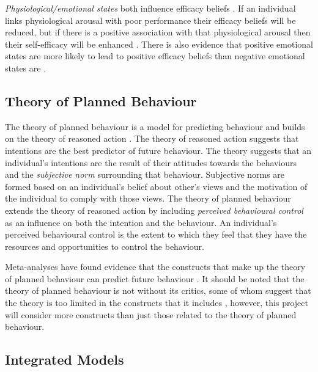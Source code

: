 \documentclass[
  12pt,
  a4paper,
]{book}
\begin{document}
\emph{Physiological/emotional states} both influence efficacy beliefs \citep{Bandura1977, Bandura1982}. If an individual links physiological arousal with poor performance their efficacy beliefs will be reduced, but if there is a positive association with that physiological arousal then their self-efficacy will be enhanced \citep{Hauck2008, Jones1995, Jones1992}. There is also evidence that positive emotional states are more likely to lead to positive efficacy beliefs than negative emotional states are \citep{Maddux1995, Martin2002}.

\hypertarget{theory-of-planned-behaviour}{%
\subsection{Theory of Planned Behaviour}\label{theory-of-planned-behaviour}}

The theory of planned behaviour \citep{Ajzen1991, Ajzen1986} is a model for predicting behaviour and builds on the theory of reasoned action \citep{Ajzen1980}. The theory of reasoned action suggests that intentions are the best predictor of future behaviour. The theory suggests that an individual's intentions are the result of their attitudes towards the behaviours and the \emph{subjective norm} surrounding that behaviour. Subjective norms are formed based on an individual's belief about other's views and the motivation of the individual to comply with those views. The theory of planned behaviour extends the theory of reasoned action by including \emph{perceived behavioural control} as an influence on both the intention and the behaviour. An individual's perceived behavioural control is the extent to which they feel that they have the resources and opportunities to control the behaviour.

Meta-analyses have found evidence that the constructs that make up the theory of planned behaviour can predict future behaviour \citep{Armitage2001, Hagger2002}. It should be noted that the theory of planned behaviour is not without its critics, some of whom suggest that the theory is too limited in the constructs that it includes \citep[cf.~][]{Sniehotta2014}, however, this project will consider more constructs than just those related to the theory of planned behaviour.

\hypertarget{integrated-models}{%
\subsection{Integrated Models}\label{integrated-models}}
\end{document}
